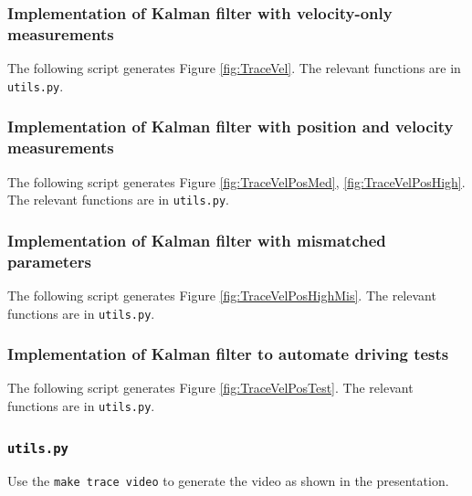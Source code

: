 \documentclass[11pt]{article}
\begin{document}
\subsubsection*{Implementation of Kalman filter with velocity-only measurements}

The following script generates Figure \ref{fig:TraceVel}. The relevant functions are in \texttt{utils.py}.



\subsubsection*{Implementation of Kalman filter with position and velocity measurements}

The following script generates Figure \ref{fig:TraceVelPosMed}, \ref{fig:TraceVelPosHigh}. The relevant functions are in \texttt{utils.py}.



\subsubsection*{Implementation of Kalman filter with mismatched parameters}

The following script generates Figure \ref{fig:TraceVelPosHighMis}. The relevant functions are in \texttt{utils.py}.



\subsubsection*{Implementation of Kalman filter to automate driving tests}

The following script generates Figure \ref{fig:TraceVelPosTest}. The relevant functions are in \texttt{utils.py}.



\subsubsection*{\texttt{utils.py}}

Use the \texttt{make trace video} to generate the video as shown in the presentation.


\end{document}

